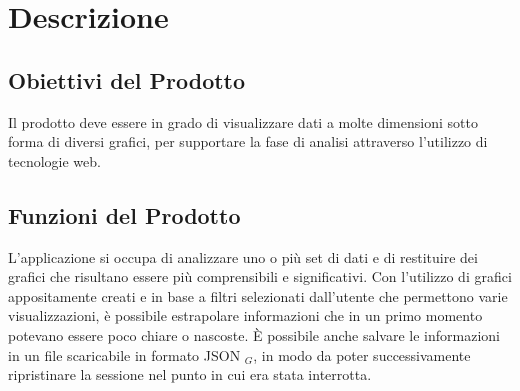 \chapter{Descrizione}

\section{Obiettivi del Prodotto}
Il prodotto deve essere in grado di visualizzare dati a molte dimensioni sotto forma di diversi grafici, per supportare la fase di analisi attraverso l'utilizzo di tecnologie web.

\section{Funzioni del Prodotto}
L'applicazione si occupa di analizzare uno o più set di dati e di restituire dei grafici che risultano essere più comprensibili e significativi.
Con l'utilizzo di grafici appositamente creati e in base a filtri selezionati dall'utente che permettono varie visualizzazioni, è possibile estrapolare informazioni che in un primo momento potevano essere poco chiare o nascoste.
È possibile anche salvare le informazioni in un file scaricabile in formato JSON $_G$, in modo da poter successivamente ripristinare la sessione nel punto in cui era stata interrotta.
